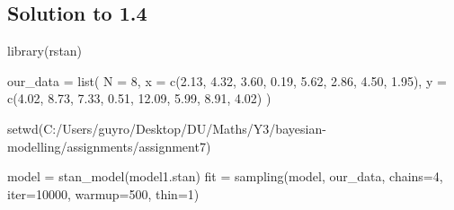 \documentclass[
]{article}
\newenvironment{Shaded}{\begin{snugshade}}{\end{snugshade}}
\newcommand{\AttributeTok}[1]{\textcolor[rgb]{0.77,0.63,0.00}{#1}}
\newcommand{\DecValTok}[1]{\textcolor[rgb]{0.00,0.00,0.81}{#1}}
\newcommand{\FloatTok}[1]{\textcolor[rgb]{0.00,0.00,0.81}{#1}}
\newcommand{\FunctionTok}[1]{\textcolor[rgb]{0.00,0.00,0.00}{#1}}
\newcommand{\NormalTok}[1]{#1}
\newcommand{\OtherTok}[1]{\textcolor[rgb]{0.56,0.35,0.01}{#1}}
\newcommand{\StringTok}[1]{\textcolor[rgb]{0.31,0.60,0.02}{#1}}
\begin{document}
\hypertarget{solution-to-1.4}{%
\subsection{Solution to 1.4}\label{solution-to-1.4}}

\begin{Shaded}
\begin{Highlighting}[]
\FunctionTok{library}\NormalTok{(rstan)}

\NormalTok{our\_data }\OtherTok{=} \FunctionTok{list}\NormalTok{(}
  \AttributeTok{N =} \DecValTok{8}\NormalTok{,}
  \AttributeTok{x =} \FunctionTok{c}\NormalTok{(}\FloatTok{2.13}\NormalTok{, }\FloatTok{4.32}\NormalTok{, }\FloatTok{3.60}\NormalTok{, }\FloatTok{0.19}\NormalTok{, }\FloatTok{5.62}\NormalTok{, }\FloatTok{2.86}\NormalTok{, }\FloatTok{4.50}\NormalTok{, }\FloatTok{1.95}\NormalTok{),}
  \AttributeTok{y =} \FunctionTok{c}\NormalTok{(}\FloatTok{4.02}\NormalTok{, }\FloatTok{8.73}\NormalTok{, }\FloatTok{7.33}\NormalTok{, }\FloatTok{0.51}\NormalTok{, }\FloatTok{12.09}\NormalTok{, }\FloatTok{5.99}\NormalTok{, }\FloatTok{8.91}\NormalTok{, }\FloatTok{4.02}\NormalTok{)}
\NormalTok{)}

\FunctionTok{setwd}\NormalTok{(}\StringTok{\textquotesingle{}C:/Users/guyro/Desktop/DU/Maths/Y3/bayesian{-}modelling/assignments/assignment7\textquotesingle{}}\NormalTok{)}

\NormalTok{model }\OtherTok{=} \FunctionTok{stan\_model}\NormalTok{(}\StringTok{\textquotesingle{}model1.stan\textquotesingle{}}\NormalTok{)}
\NormalTok{fit }\OtherTok{=} \FunctionTok{sampling}\NormalTok{(model, our\_data, }\AttributeTok{chains=}\DecValTok{4}\NormalTok{, }\AttributeTok{iter=}\DecValTok{10000}\NormalTok{, }\AttributeTok{warmup=}\DecValTok{500}\NormalTok{, }\AttributeTok{thin=}\DecValTok{1}\NormalTok{)}
\end{Highlighting}
\end{Shaded}
\end{document}
